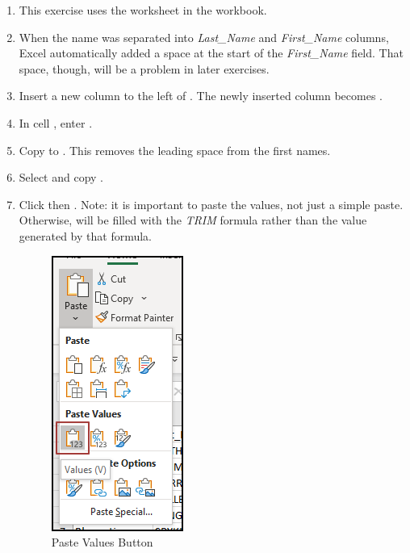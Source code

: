\begin{enumerate}
	\item This exercise uses the  worksheet in the  workbook.
	\item When the name was separated into \textit{Last\_Name} and \textit{First\_Name} columns, Excel automatically added a space at the start of the \textit{First\_Name} field. That space, though, will be a problem in later exercises. 
	\item Insert a new column to the left of . The newly inserted column becomes .
	\item In cell , enter .
	\item Copy  to . This removes the leading space from the first names.
	\item Select and copy .
	\item Click  then . Note: it is important to paste the values, not just a simple paste. Otherwise,  will be filled with the \textit{TRIM} formula rather than the value generated by that formula.
	
	\begin{figure}[H]
		\centering
		\includegraphics[width=\maxwidth{.65\linewidth}]{gfx/ch09_fig34}
		\caption{Paste Values Button}
		\label{09:fig34}
	\end{figure}
	

\end{enumerate}
